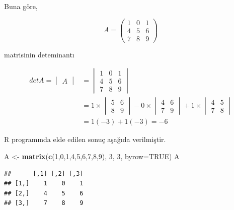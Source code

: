 \documentclass[
]{book}
\newenvironment{Shaded}{\begin{snugshade}}{\end{snugshade}}
\newcommand{\AttributeTok}[1]{\textcolor[rgb]{0.13,0.29,0.53}{#1}}
\newcommand{\ConstantTok}[1]{\textcolor[rgb]{0.56,0.35,0.01}{#1}}
\newcommand{\DecValTok}[1]{\textcolor[rgb]{0.00,0.00,0.81}{#1}}
\newcommand{\FunctionTok}[1]{\textcolor[rgb]{0.13,0.29,0.53}{\textbf{#1}}}
\newcommand{\NormalTok}[1]{#1}
\newcommand{\OtherTok}[1]{\textcolor[rgb]{0.56,0.35,0.01}{#1}}
\begin{document}
Buna göre,

\[A=
\begin{pmatrix}
 1 & 0 & 1 \\
 4 & 5 & 6 \\
 7 & 8 & 9
\end{pmatrix}\]

matrisinin deteminantı

\[\begin{aligned}
detA=
\begin{vmatrix}
 A
\end{vmatrix}
&=   
\begin{vmatrix}
 1 & 0 & 1 \\
 4 & 5 & 6 \\
 7 & 8 & 9
\end{vmatrix} \\
&=
1×
\begin{vmatrix}
 5 & 6 \\
 8 & 9 
\end{vmatrix}
 -
0× 
\begin{vmatrix}
 4 & 6 \\
 7 & 9 
\end{vmatrix}
 +
1×
\begin{vmatrix}
 4 & 5 \\
 7 & 8 
\end{vmatrix} \\
& =
1(-3)+1(-3)=-6
\end{aligned}\]

R programında elde edilen sonuç aşağıda verilmiştir.

\begin{Shaded}
\begin{Highlighting}[]
\NormalTok{ A }\OtherTok{\textless{}{-}} \FunctionTok{matrix}\NormalTok{(}\FunctionTok{c}\NormalTok{(}\DecValTok{1}\NormalTok{,}\DecValTok{0}\NormalTok{,}\DecValTok{1}\NormalTok{,}\DecValTok{4}\NormalTok{,}\DecValTok{5}\NormalTok{,}\DecValTok{6}\NormalTok{,}\DecValTok{7}\NormalTok{,}\DecValTok{8}\NormalTok{,}\DecValTok{9}\NormalTok{), }\DecValTok{3}\NormalTok{, }\DecValTok{3}\NormalTok{, }\AttributeTok{byrow=}\ConstantTok{TRUE}\NormalTok{) }
\NormalTok{ A }
\end{Highlighting}
\end{Shaded}

\begin{verbatim}
##      [,1] [,2] [,3]
## [1,]    1    0    1
## [2,]    4    5    6
## [3,]    7    8    9
\end{verbatim}
\end{document}
